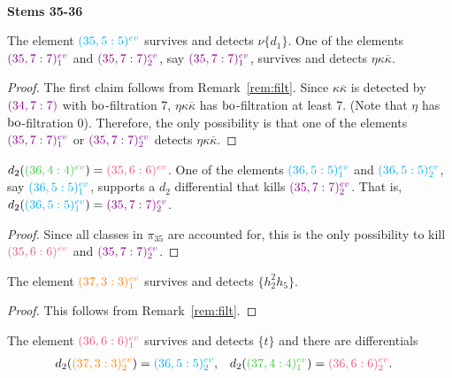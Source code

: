 \ \\
\noindent
{\bf Stems 35-36}

\noindent

\begin{prop}
The element $\evr{35}{5}{cyan}$ survives and detects $\nu\{d_1\}$. One of the elements $\evrm{35}{7}{darkmagenta}{1}$ and $\evrm{35}{7}{darkmagenta}{2}$, say $\evrm{35}{7}{darkmagenta}{1}$, survives and detects $\eta\kappa\overline{\kappa}$.
\end{prop}

\begin{proof}
The first claim follows from Remark~\ref{rem:filt}. Since $\kappa\overline{\kappa}$ is detected by $\gdr{34}{7}{7}{darkmagenta}$ with $\bo$-filtration 7, $\eta\kappa\overline{\kappa}$ has $\bo$-filtration at least 7. (Note that $\eta$ has $\bo$-filtration 0). Therefore, the only possibility is that one of the elements $\evrm{35}{7}{darkmagenta}{1}$ or $\evrm{35}{7}{darkmagenta}{2}$ detects $\eta\kappa\overline{\kappa}$.
\end{proof}

\begin{prop}
$d_2(\evr{36}{4}{limegreen})=\evr{35}{6}{lavenderrose}$.
One of the elements $\evrm{36}{5}{cyan}{1}$ and $\evrm{36}{5}{cyan}{2}$, say $\evrm{36}{5}{cyan}{1}$, supports a $d_2$ differential that kills $\evrm{35}{7}{darkmagenta}{2}$. That is, $d_2(\evrm{36}{5}{cyan}{1})=\evrm{35}{7}{darkmagenta}{2}$.
\end{prop}

\begin{proof}
Since all classes in $\pi_{35}$ are accounted for, this is the only possibility to kill $\evr{35}{6}{lavenderrose}$ and $\evrm{35}{7}{darkmagenta}{2}$.
\end{proof}

\begin{prop}
The element $\evrm{37}{3}{orange}{1}$ survives and detects $\{h_2^2h_5\}$.
\end{prop}

\begin{proof}
This follows from Remark~\ref{rem:filt}.
\end{proof}



\begin{prop}
The element $\evrm{36}{6}{lavenderrose}{1}$ survives and detects $\{t\}$ and there are differentials 
\begin{align*}
d_2(\evrm{37}{3}{orange}{2}) &= \evrm{36}{5}{cyan}{2}, & d_2(\evrm{37}{4}{limegreen}{1}) &= \evrm{36}{6}{lavenderrose}{2}.\end{align*}
\end{prop}


